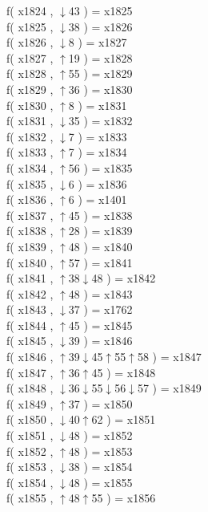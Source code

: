 f( x1824 , $\downarrow$43 ) = x1825 \\
f( x1825 , $\downarrow$38 ) = x1826 \\
f( x1826 , $\downarrow$8 ) = x1827 \\
f( x1827 , $\uparrow$19 ) = x1828 \\
f( x1828 , $\uparrow$55 ) = x1829 \\
f( x1829 , $\uparrow$36 ) = x1830 \\
f( x1830 , $\uparrow$8 ) = x1831 \\
f( x1831 , $\downarrow$35 ) = x1832 \\
f( x1832 , $\downarrow$7 ) = x1833 \\
f( x1833 , $\uparrow$7 ) = x1834 \\
f( x1834 , $\uparrow$56 ) = x1835 \\
f( x1835 , $\downarrow$6 ) = x1836 \\
f( x1836 , $\uparrow$6 ) = x1401 \\
f( x1837 , $\uparrow$45 ) = x1838 \\
f( x1838 , $\uparrow$28 ) = x1839 \\
f( x1839 , $\uparrow$48 ) = x1840 \\
f( x1840 , $\uparrow$57 ) = x1841 \\
f( x1841 , $\uparrow$38$\downarrow$48 ) = x1842 \\
f( x1842 , $\uparrow$48 ) = x1843 \\
f( x1843 , $\downarrow$37 ) = x1762 \\
f( x1844 , $\uparrow$45 ) = x1845 \\
f( x1845 , $\downarrow$39 ) = x1846 \\
f( x1846 , $\uparrow$39$\downarrow$45$\uparrow$55$\uparrow$58 ) = x1847 \\
f( x1847 , $\uparrow$36$\uparrow$45 ) = x1848 \\
f( x1848 , $\downarrow$36$\downarrow$55$\downarrow$56$\downarrow$57 ) = x1849 \\
f( x1849 , $\uparrow$37 ) = x1850 \\
f( x1850 , $\downarrow$40$\uparrow$62 ) = x1851 \\
f( x1851 , $\downarrow$48 ) = x1852 \\
f( x1852 , $\uparrow$48 ) = x1853 \\
f( x1853 , $\downarrow$38 ) = x1854 \\
f( x1854 , $\downarrow$48 ) = x1855 \\
f( x1855 , $\uparrow$48$\uparrow$55 ) = x1856 \\
